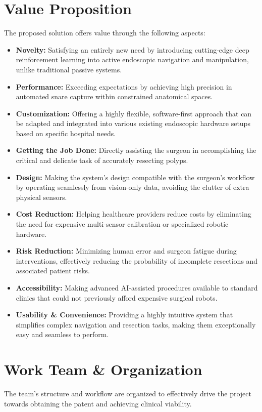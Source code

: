 \section{Value Proposition}
The proposed solution offers value through the following aspects:
\begin{itemize}
    \item \textbf{Novelty:} Satisfying an entirely new need by introducing cutting-edge deep reinforcement learning into active endoscopic navigation and manipulation, unlike traditional passive systems.
    \item \textbf{Performance:} Exceeding expectations by achieving high precision in automated snare capture within constrained anatomical spaces.
    \item \textbf{Customization:} Offering a highly flexible, software-first approach that can be adapted and integrated into various existing endoscopic hardware setups based on specific hospital needs.
    \item \textbf{Getting the Job Done:} Directly assisting the surgeon in accomplishing the critical and delicate task of accurately resecting polyps.
    \item \textbf{Design:} Making the system's design compatible with the surgeon's workflow by operating seamlessly from vision-only data, avoiding the clutter of extra physical sensors.
    \item \textbf{Cost Reduction:} Helping healthcare providers reduce costs by eliminating the need for expensive multi-sensor calibration or specialized robotic hardware.
    \item \textbf{Risk Reduction:} Minimizing human error and surgeon fatigue during interventions, effectively reducing the probability of incomplete resections and associated patient risks.
    \item \textbf{Accessibility:} Making advanced AI-assisted procedures available to standard clinics that could not previously afford expensive surgical robots.
    \item \textbf{Usability \& Convenience:} Providing a highly intuitive system that simplifies complex navigation and resection tasks, making them exceptionally easy and seamless to perform.
\end{itemize}

\section{Work Team \& Organization}
The team's structure and workflow are organized to effectively drive the project towards obtaining the patent and achieving clinical viability.

